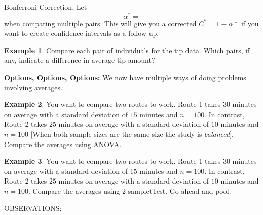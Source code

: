 \documentclass[12pt]{amsart}
\theoremstyle{definition}
\newtheorem{ex}{Example}
\begin{document}
\begin{framed} 
 Bonferroni Correction. Let $$\alpha^*=$$ when comparing multiple pairs. This will give you a corrected $C^*=1-\alpha*$ if you want to create confidence intervals as a follow up.
\end{framed}

\begin{ex} Compare each pair of individuals for the tip data. Which pairs, if any, indicate a difference in average tip amount?
\end{ex}
\vfill
\newpage
\textbf{Options, Options, Options:} We now have multiple ways of doing problems involving averages.
\begin{ex}
You want to compare two routes to work. Route 1 takes $30$ minutes on average with a standard deviation of $15$ minutes and $n=100$. In contrast, Route 2 takes $25$ minutes on average with a standard deviation of $10$ minutes and $n=100$ [When both sample sizes are the same size the study is \emph{balanced}]. Compare the averages using ANOVA.
\end{ex}
\vfill

\begin{ex}
You want to compare two routes to work. Route 1 takes $30$ minutes on average with a standard deviation of $15$ minutes and $n=100$. In contrast, Route 2 takes $25$ minutes on average with a standard deviation of $10$ minutes and $n=100$. Compare the averages using 2-sampletTest. Go ahead and pool.\end{ex}
\vfill
OBSERVATIONS:
\vspace{1in}
\end{document}
